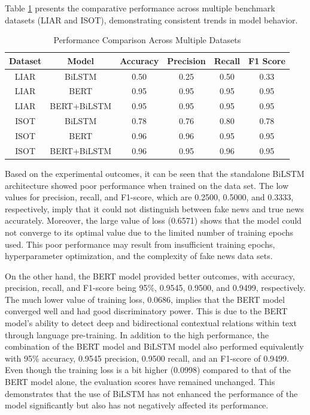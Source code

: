 \documentclass[runningheads]{llncs}
\begin{document}
 Table \ref{tab:comparison_extended} presents the comparative performance across multiple benchmark datasets (LIAR and ISOT), demonstrating consistent trends in model behavior.

\begin{table}[h]
\centering
\caption{Performance Comparison Across Multiple Datasets}
\label{tab:comparison_extended}
\small
\begin{tabular}{cccccc}
\hline
\textbf{Dataset} & \textbf{Model} & \textbf{Accuracy} & \textbf{Precision} & \textbf{Recall} & \textbf{F1 Score} \\ \hline
LIAR & BiLSTM & 0.50 & 0.25 & 0.50 & 0.33 \\
LIAR & BERT & 0.95 & 0.95 & 0.95 & 0.95 \\
LIAR & BERT+BiLSTM & 0.95 & 0.95 & 0.95 & 0.95 \\ 
ISOT & BiLSTM & 0.78 & 0.76 & 0.80 & 0.78 \\
ISOT & BERT & 0.96 & 0.96 & 0.95 & 0.95 \\
ISOT & BERT+BiLSTM & 0.96 & 0.95 & 0.96 & 0.95 \\ \hline
\end{tabular}
\end{table}

Based on the experimental outcomes, it can be seen that the standalone BiLSTM architecture showed poor performance when trained on the data set. The low values for precision, recall, and F1-score, which are 0.2500, 0.5000, and 0.3333, respectively, imply that it could not distinguish between fake news and true news accurately. Moreover, the large value of loss (0.6571) shows that the model could not converge to its optimal value due to the limited number of training epochs used. This poor performance may result from insufficient training epochs, hyperparameter optimization, and the complexity of fake news data sets.

On the other hand, the BERT model provided better outcomes, with accuracy, precision, recall, and F1-score being 95\%, 0.9545, 0.9500, and 0.9499, respectively. The much lower value of training loss, 0.0686, implies that the BERT model converged well and had good discriminatory power. This is due to the BERT model's ability to detect deep and bidirectional contextual relations within text through language pre-training.
In addition to the high performance, the combination of the BERT model and BiLSTM model also performed equivalently with 95\% accuracy, 0.9545 precision, 0.9500 recall, and an F1-score of 0.9499. Even though the training loss is a bit higher (0.0998) compared to that of the BERT model alone, the evaluation scores have remained unchanged. This demonstrates that the use of BiLSTM has not enhanced the performance of the model significantly but also has not negatively affected its performance.
\end{document}
